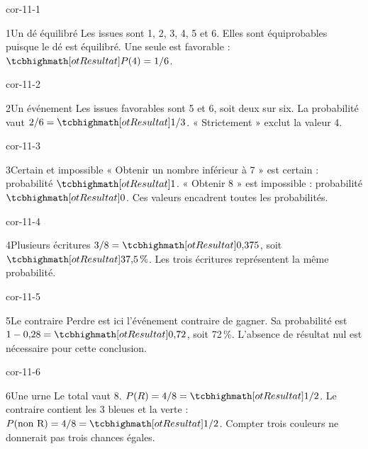 \clearpage\pagestyle{otMain}\setlength{\otBlocEspacement}{2.5mm}\fontsize{11}{15}\selectfont{}
\begin{blocLivre}{cor-11-1}\begin{corrige}{1}{Un dé équilibré}
Les issues sont 1, 2, 3, 4, 5 et 6. Elles sont équiprobables puisque le dé est équilibré. Une seule est favorable : $\res{P(4)=1/6}$.
\end{corrige}\end{blocLivre}
\begin{blocLivre}{cor-11-2}\begin{corrige}{2}{Un événement}
Les issues favorables sont 5 et 6, soit deux sur six. La probabilité vaut $2/6=\res{1/3}$. « Strictement » exclut la valeur 4.
\end{corrige}\end{blocLivre}
\begin{blocLivre}{cor-11-3}\begin{corrige}{3}{Certain et impossible}
« Obtenir un nombre inférieur à 7 » est certain : probabilité $\res1$. « Obtenir 8 » est impossible : probabilité $\res0$. Ces valeurs encadrent toutes les probabilités.
\end{corrige}\end{blocLivre}
\begin{blocLivre}{cor-11-4}\begin{corrige}{4}{Plusieurs écritures}
$3/8=\res{0{,}375}$, soit $\res{37{,}5\,\%}$. Les trois écritures représentent la même probabilité.
\end{corrige}\end{blocLivre}
\begin{blocLivre}{cor-11-5}\begin{corrige}{5}{Le contraire}
Perdre est ici l’événement contraire de gagner. Sa probabilité est $1-0{,}28=\res{0{,}72}$, soit 72\,\%. L’absence de résultat nul est nécessaire pour cette conclusion.
\end{corrige}\end{blocLivre}
\begin{blocLivre}{cor-11-6}\begin{corrige}{6}{Une urne}
Le total vaut 8. $P(R)=4/8=\res{1/2}$. Le contraire contient les 3 bleues et la verte : $P(\text{non R})=4/8=\res{1/2}$. Compter trois couleurs ne donnerait pas trois chances égales.
\label{fig-cor-11-6}
\end{corrige}\end{blocLivre}
